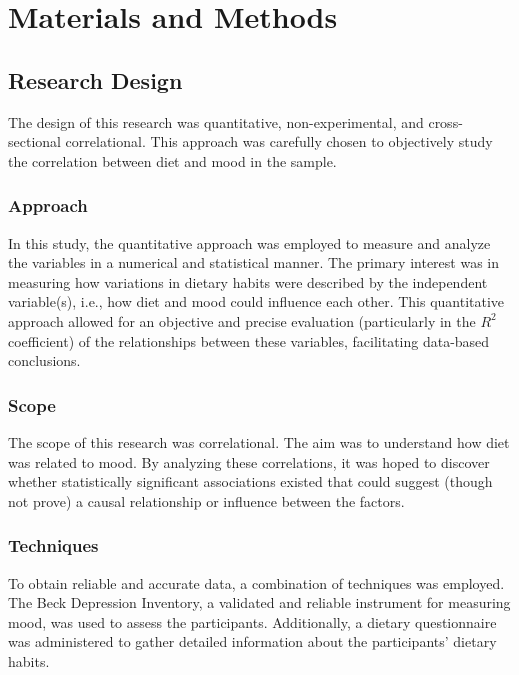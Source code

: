 \documentclass[jou]{apa7}
\begin{document}
\section{Materials and Methods}\label{materiales-y-muxe9todos}

\subsection{Research Design}\label{diseuxf1o-investigaciuxf3n}

The design of this research was quantitative, non-experimental, and cross-sectional correlational. This approach was carefully chosen to objectively study the correlation between diet and mood in the sample.\\

\subsubsection{Approach}
In this study, the quantitative approach was employed to measure and analyze the variables in a numerical and statistical manner. The primary interest was in measuring how variations in dietary habits were described by the independent variable(s), i.e., how diet and mood could influence each other. This quantitative approach allowed for an objective and precise evaluation (particularly in the $R^2$ coefficient) of the relationships between these variables, facilitating data-based conclusions.\\

\subsubsection{Scope}
The scope of this research was correlational.
The aim was to understand how diet was related to mood. By analyzing these correlations, it was hoped to discover whether statistically significant associations existed that could suggest (though not prove) a causal relationship or influence between the factors.

\subsubsection{Techniques}
To obtain reliable and accurate data, a combination of techniques was employed. The Beck Depression Inventory, a validated and reliable instrument for measuring mood, was used to assess the participants. Additionally, a dietary questionnaire was administered to gather detailed information about the participants' dietary habits.
\end{document}
